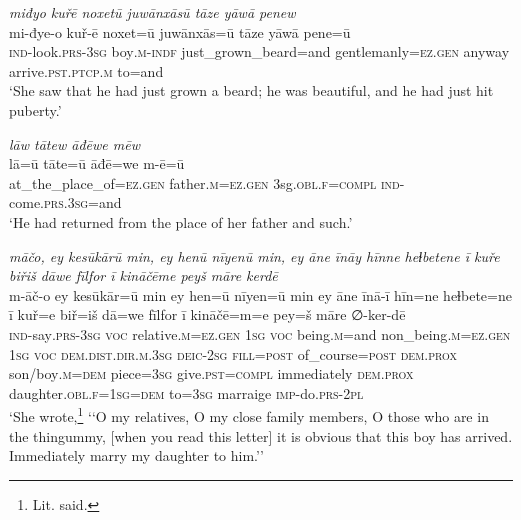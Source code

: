 \ea \label{KŠ.74}
\textit{miđyo kuřē noxetū juwānxāsū tāze yāwā penew} \\ 
\gll mi-đye-o kuř-ē noxet=ū juwānxās=ū tāze yāwā pene=ū \\ 
 \textsc{ind-}look\textsc{.prs}\textsc{-3sg} boy\textsc{.m}\textsc{-indf} just\_grown\_beard=and gentlemanly\textsc{\textsc{=ez.gen}} anyway arrive\textsc{.pst}\textsc{.ptcp}\textsc{.m} to=and \\ 
\glt `She saw that he had just grown a beard; he was beautiful, and he had just hit puberty.'
\z 
 
\ea \label{KŠ.75}
\textit{lāw tātew āđēwe mēw} \\ 
\gll lā=ū tāte=ū āđē=we m-ē=ū \\ 
 at\_the\_place\_of\textsc{\textsc{=ez.gen}} father\textsc{.m}\textsc{\textsc{=ez.gen}} 3sg\textsc{.obl}\textsc{.f}\textsc{=compl} \textsc{ind-}come\textsc{.prs}\textsc{.3sg}=and \\ 
\glt `He had returned from the place of her father and such.'
\z 
 
\ea \label{KŠ.80}
\textit{māčo, ey kesūkārū min, ey henū nīyenū min, ey āne īnāy hīnne heɫbetene ī kuře biřiš dāwe fīlfor ī kināčēme peyš māre kerdē} \\ 
\gll m-āč-o ey kesūkār=ū min ey hen=ū nīyen=ū min ey āne īnā-ī hīn=ne heɫbete=ne ī kuř=e biř=iš dā=we fīlfor ī kināčē=m=e pey=š māre ∅-ker-dē \\ 
 \textsc{ind-}say\textsc{.prs}\textsc{-3sg} \textsc{voc} relative\textsc{.m}\textsc{\textsc{=ez.gen}} \textsc{1sg} \textsc{voc} being\textsc{.m}=and non\_being\textsc{.m}\textsc{\textsc{=ez.gen}} \textsc{1sg} \textsc{voc} \textsc{dem.dist}\textsc{.dir}\textsc{.m}\textsc{.3sg} \textsc{deic}-\textsc{2sg} \textsc{fill}\textsc{=\textsc{post}} of\_course\textsc{=\textsc{post}} \textsc{dem.prox} son/boy\textsc{.m}\textsc{=dem} piece\textsc{=3sg} give\textsc{.pst}\textsc{=compl} immediately \textsc{dem.prox} daughter\textsc{.obl}\textsc{.f}\textsc{=\textsc{1sg}}\textsc{=dem} to\textsc{=3sg} marraige \textsc{imp-}do\textsc{.prs}-\textsc{2pl} \\ 
\glt `She wrote,\footnote{Lit. said.} ‘‘O my relatives, O my close family members, O those who are in the thingummy, [when you read this letter] it is obvious that this boy has arrived. Immediately marry my daughter to him.’'
\z 
 
